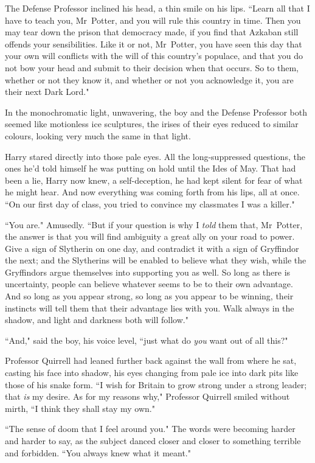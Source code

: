 The Defense Professor inclined his head, a thin smile on his lips. ``Learn all that I have to teach you, Mr~Potter, and you will rule this country in time. Then you may tear down the prison that democracy made, if you find that Azkaban still offends your sensibilities. Like it or not, Mr~Potter, you have seen this day that your own will conflicts with the will of this country's populace, and that you do not bow your head and submit to their decision when that occurs. So to them, whether or not they know it, and whether or not you acknowledge it, you are their next Dark Lord."

In the monochromatic light, unwavering, the boy and the Defense Professor both seemed like motionless ice sculptures, the irises of their eyes reduced to similar colours, looking very much the same in that light.

Harry stared directly into those pale eyes. All the long-suppressed questions, the ones he'd told himself he was putting on hold until the Ides of May. That had been a lie, Harry now knew, a self-deception, he had kept silent for fear of what he might hear. And now everything was coming forth from his lips, all at once. ``On our first day of class, you tried to convince my classmates I was a killer."

``You are." Amusedly. ``But if your question is why I \emph{told} them that, Mr~Potter, the answer is that you will find ambiguity a great ally on your road to power. Give a sign of Slytherin on one day, and contradict it with a sign of Gryffindor the next; and the Slytherins will be enabled to believe what they wish, while the Gryffindors argue themselves into supporting you as well. So long as there is uncertainty, people can believe whatever seems to be to their own advantage. And so long as you appear strong, so long as you appear to be winning, their instincts will tell them that their advantage lies with you. Walk always in the shadow, and light and darkness both will follow."

``And," said the boy, his voice level, ``just what do \emph{you} want out of all this?"

Professor Quirrell had leaned further back against the wall from where he sat, casting his face into shadow, his eyes changing from pale ice into dark pits like those of his snake form. ``I wish for Britain to grow strong under a strong leader; that \emph{is} my desire. As for my reasons why," Professor Quirrell smiled without mirth, ``I think they shall stay my own."

``The sense of doom that I feel around you." The words were becoming harder and harder to say, as the subject danced closer and closer to something terrible and forbidden. ``You always knew what it meant."

